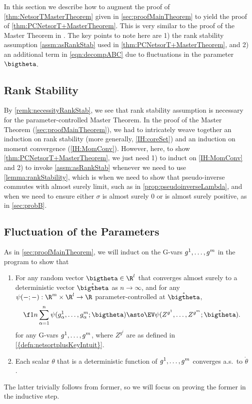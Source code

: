\documentclass[main.tex]{subfiles}
\begin{document}
\label{sec:netsortplusMasterTheoremProof}

In this section we describe how to augment the proof of \cref{thm:NetsorTMasterTheorem} given in \cref{sec:proofMainTheorem} to yield the proof of \cref{thm:PCNetsorT+MasterTheorem}.
This is very similar to the proof of the \netsorplus{} Master Theorem in \citet{yangTP1}.
The key points to note here are 1) the rank stability assumption \cref{assm:asRankStab} used in \cref{thm:PCNetsorT+MasterTheorem}, and 2) an additional term in \cref{eqn:decompABC} due to fluctuations in the parameter $\bigtheta$.

\subsection{Rank Stability}

By \cref{remk:necessityRankStab}, we see that rank stability assumption is necessary for the parameter-controlled \netsortplus{} Master Theorem.
In the proof of the \netsort{} Master Theorem (\cref{sec:proofMainTheorem}), we had to intricately weave together an induction on rank stability (more generally, \ref{IH:coreSet}) and an induction on moment convergence (\ref{IH:MomConv}).
However, here, to show \cref{thm:PCNetsorT+MasterTheorem}, we just need 1) to induct on \ref{IH:MomConv} and 2)
to invoke \cref{assm:asRankStab} whenever we need to use \cref{lemma:rankStability}, which is when we need to show that pseudo-inverse commutes with almost surely limit, such as in \cref{prop:pseudoinverseLambda}, and when we need to ensure either $\sigma$ is almost surely 0 or is almost surely positive, as in \cref{sec:probB}.

\subsection{Fluctuation of the Parameters}
\label{sec:D}
As in \cref{sec:proofMainTheorem}, we will induct on the G-vars $g^1, \ldots, g^m$ in the program to show that
\begin{enumerate}
  \item For any random vector $\bigtheta \in \R^l$ that converges almost surely to a deterministic vector $\mathring{\bigtheta}$ as $n \to \infty$, and for any $\psi(-; -): \R^\MM \times \R^l \to \R$ parameter-controlled at $\mathring{\bigtheta}$,
  \begin{align*}
      \f 1 n \sum_{\alpha=1}^n \psi(g^1_\alpha, \ldots, g^\MM_\alpha; \bigtheta) \asto \EV\psi(Z^{g^1}, \ldots, Z^{g^\MM}; \mathring{\bigtheta}).
  \end{align*}
  for any G-vars $g^1, \ldots, g^m$, 
  where $Z^{g^{i}}$ are as defined in \cref{{defn:netsortplusKeyIntuit}}.
  \item Each scalar $\theta$ that is a deterministic function of $g^1, \ldots, g^m$ converges a.s.\ to $\mathring \theta$.
\end{enumerate}
The latter trivially follows from former, so we will focus on proving the former in the inductive step.
\end{document}
